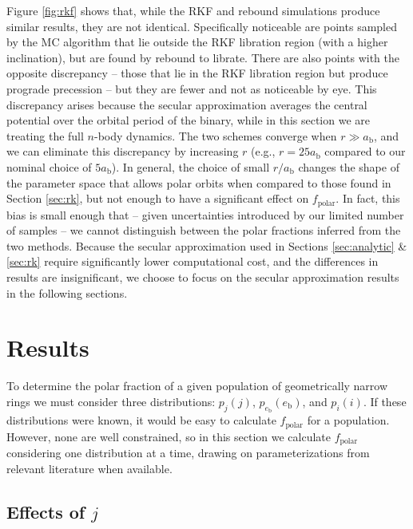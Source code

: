 \documentclass[twocolumn,linenumbers]{aastex631}
\begin{document}
Figure \ref{fig:rkf} shows that, while the RKF and {\sc rebound} simulations produce similar results, they are not identical. Specifically noticeable are points sampled by the MC algorithm that lie outside the RKF libration region (with a higher inclination), but are found by {\sc rebound} to librate. There are also points with the opposite discrepancy -- those that lie in the RKF libration region but produce prograde precession -- but they are fewer and not as noticeable by eye. This discrepancy arises because the secular approximation averages the central potential over the orbital period of the binary, while in this section we are treating the full $n$-body dynamics. The two schemes converge when $r \gg a_\text{b}$, and we can eliminate this discrepancy by increasing $r$ (e.g., $r=25a_\text{b}$ compared to our nominal choice of $5a_\text{b}$). In general, the choice of small $r/a_\text{b}$ changes the shape of the parameter space that allows polar orbits when compared to those found in Section \ref{sec:rk}, but not enough to have a significant effect on $f_\text{polar}$. In fact, this bias is small enough that -- given uncertainties introduced by our limited number of samples -- we cannot distinguish between the polar fractions inferred from the two methods. Because the secular approximation used in Sections \ref{sec:analytic} \& \ref{sec:rk} require significantly lower computational cost, and the differences in results are insignificant, we choose to focus on the secular approximation results in the following sections.

\section{Results}
\label{sec:results}

To determine the polar fraction of a given population of geometrically narrow rings we must consider three distributions: $p_j(j)$, $p_{e_\text{b}}(e_\text{b})$, and $p_i(i)$. If these distributions were known, it would be easy to calculate $f_\text{polar}$ for a population. However, none are well constrained, so in this section we calculate $f_\text{polar}$ considering one distribution at a time, drawing on parameterizations from relevant literature when available.

\subsection{Effects of $j$}
\label{subsec:effect-j}
\end{document}
